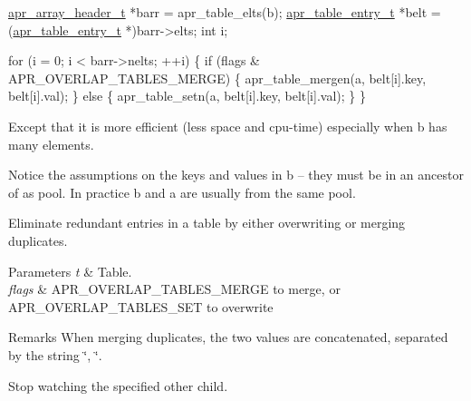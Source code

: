 \begin{DoxyPre}
 \mbox{\hyperlink{structapr__array__header__t}{apr\_array\_header\_t}} *barr = apr\_table\_elts(b);
 \mbox{\hyperlink{structapr__table__entry__t}{apr\_table\_entry\_t}} *belt = (\mbox{\hyperlink{structapr__table__entry__t}{apr\_table\_entry\_t}} *)barr->elts;
 int i;\end{DoxyPre}



\begin{DoxyPre} for (i = 0; i < barr->nelts; ++i) \{
     if (flags \& APR\_OVERLAP\_TABLES\_MERGE) \{
         apr\_table\_mergen(a, belt[i].key, belt[i].val);
     \}
     else \{
         apr\_table\_setn(a, belt[i].key, belt[i].val);
     \}
 \}
\end{DoxyPre}


Except that it is more efficient (less space and cpu-\/time) especially when b has many elements.

Notice the assumptions on the keys and values in b -- they must be in an ancestor of a\textquotesingle{}s pool. In practice b and a are usually from the same pool.

Eliminate redundant entries in a table by either overwriting or merging duplicates.


\begin{DoxyParams}{Parameters}
{\em t} & Table. \\
\hline
{\em flags} & A\+P\+R\+\_\+\+O\+V\+E\+R\+L\+A\+P\+\_\+\+T\+A\+B\+L\+E\+S\+\_\+\+M\+E\+R\+GE to merge, or A\+P\+R\+\_\+\+O\+V\+E\+R\+L\+A\+P\+\_\+\+T\+A\+B\+L\+E\+S\+\_\+\+S\+ET to overwrite \\
\hline
\end{DoxyParams}
\begin{DoxyRemark}{Remarks}
When merging duplicates, the two values are concatenated, separated by the string \char`\"{}, \char`\"{}.
\end{DoxyRemark}
Stop watching the specified other child. ~\newline

